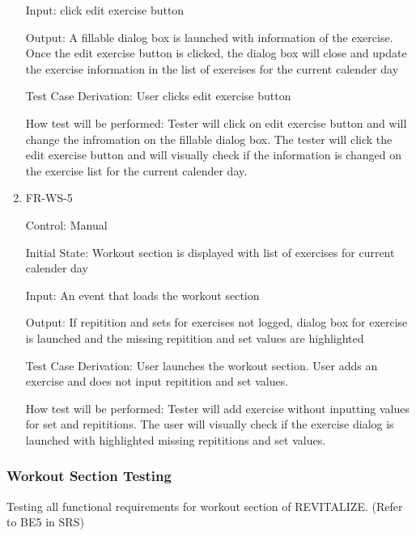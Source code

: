 \documentclass[12pt, titlepage]{article}
\begin{document}
\begin{enumerate}
Input: click edit exercise button
					
Output: A fillable dialog box is launched with information of the exercise. Once the edit exercise button is clicked, the dialog box will close and update the exercise information in the list of exercises for the current calender day

Test Case Derivation: User clicks edit exercise button

How test will be performed: Tester will click on edit exercise button and will change the infromation on the fillable dialog box. The tester will click the edit exercise button and will visually check if the information is changed on the exercise list for the current calender day.

\item{FR-WS-5\\}

Control: Manual
					
Initial State: Workout section is displayed with list of exercises for current calender day
					
Input: An event that loads the workout section
					
Output: If repitition and sets for exercises not logged, dialog box for exercise is launched and the missing repitition and set values are highlighted

Test Case Derivation: User launches the workout section. User adds an exercise and does not input repitition and set values.

How test will be performed: Tester will add exercise without inputting values for set and repititions. The user will visually check if the exercise dialog is launched with highlighted missing repititions and set values.

\end{enumerate}


\subsubsection{Workout Section Testing}

Testing all functional requirements for workout section of REVITALIZE. (Refer to BE5 in SRS)
\end{document}
